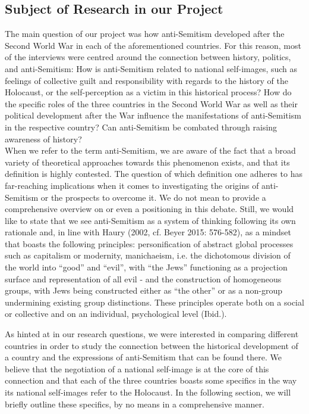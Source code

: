 \subsection*{Subject of Research in our Project}
The main question of our project was how anti-Semitism developed after the Second World War in each of the aforementioned countries. For this reason, most of the interviews were centred around the connection between history, politics, and anti-Semitism: How is anti-Semitism related to national self-images, such as feelings of collective guilt and responsibility with regards to the history of the Holocaust, or the self-perception as a victim in this historical process? How do the specific roles of the three countries in the Second World War as well as their political development after the War influence the manifestations of anti-Semitism in the respective country? Can anti-Semitism be combated through raising awareness of history? \\
When we refer to the term anti-Semitism, we are aware of the fact that a broad variety of theoretical approaches towards this phenomenon exists, and that its definition is highly contested. The question of which definition one adheres to has far-reaching implications when it comes to investigating the origins of anti-Semitism or the prospects to overcome it. We do not mean to provide a comprehensive overview on or even a positioning in this debate. Still, we would like to state that we see anti-Semitism as a system of thinking following its own rationale and, in line with Haury (2002, cf. Beyer 2015: 576-582), as a mindset that boasts the following principles: personification of abstract global processes such as capitalism or modernity, manichaeism, i.e. the dichotomous division of the world into ``good'' and ``evil'', with ``the Jews'' functioning as a projection surface and representation of all evil - and the construction of homogeneous groups, with Jews being constructed either as ``the other'' or as a non-group undermining existing group distinctions. These principles operate both on a social or collective and on an individual, psychological level (Ibid.).\par
As hinted at in our research questions, we were interested in comparing different countries in order to study the connection between the historical development of a country and the expressions of anti-Semitism that can be found there. We believe that the negotiation of a national self-image is at the core of this connection and that each of the three countries boasts some specifics in the way its national self-images refer to the Holocaust. In the following section, we will briefly outline these specifics, by no means in a comprehensive manner. \par
